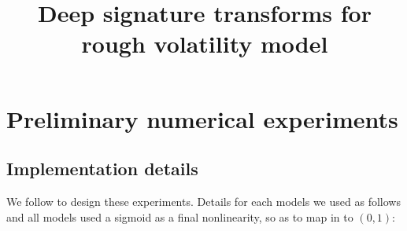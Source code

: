 \documentclass[]{article}
\title{Deep signature transforms for rough volatility model}
\author{}
\date{}
\renewcommand{\(}{\left(}
\renewcommand{\)}{\right)}
\begin{document}
\maketitle

%

\section{Preliminary numerical experiments}
\subsection{Implementation details}\label{sec1}
We follow \cite{Lyons_2019_DeepSignature} to design these experiments. Details for each models we used as follows and all models used a sigmoid as a final nonlinearity, so as to map in to $(0, 1)$:
\end{document}
